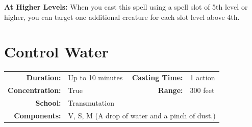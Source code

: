 \documentclass[12pt,showtrims]{memoir}
\begin{document}
\vspace{8pt} \noindent\textbf{At Higher Levels:} When you cast this spell using a spell slot of 5th level or higher, you can target one additional creature for each slot level above 4th.
\newpage
\section*{Control Water}

{
\small\centering\vspace{-6pt}
\begin{tabular}{rlrl}
\toprule

\textbf{Duration:} & Up to 10 minutes &
\textbf{Casting Time:} & 1 action \\
\textbf{Concentration:} & True &
\textbf{Range:} & 300 feet \\
\textbf{School:} & Transmutation \\
\textbf{Components:} & \multicolumn{3}{p{0.7\textwidth}}{V, S, M (A drop of water and a pinch of dust.)}\\

\bottomrule
\end{tabular}
}
\end{document}
